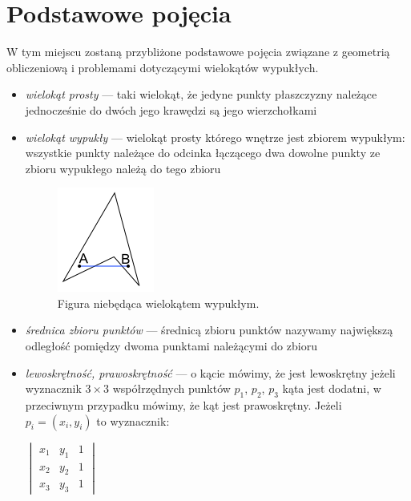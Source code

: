 \chapter{Podstawowe pojęcia}
W tym miejscu zostaną przybliżone podstawowe pojęcia związane z
geometrią obliczeniową i problemami dotyczącymi wielokątów wypukłych.

\begin{itemize}
\item{\emph{wielokąt prosty}} --- taki wielokąt, że jedyne punkty
  płaszczyzny należące jednocześnie do dwóch jego krawędzi są jego
  wierzchołkami
\item{\emph{wielokąt wypukły}} --- wielokąt prosty którego wnętrze
  jest zbiorem wypukłym: wszystkie punkty należące do odcinka
  łączącego dwa dowolne punkty ze zbioru wypukłego należą do tego
  zbioru

  \begin{figure}[htp]
    \centering
    \includegraphics{img/nonconvex}
    \caption{Figura niebędąca wielokątem wypukłym.}
  \end{figure}

\item{\emph{średnica zbioru punktów}} --- średnicą zbioru punktów
  nazywamy największą odległość pomiędzy dwoma punktami należącymi do
  zbioru

\item{\emph{lewoskrętność, prawoskrętność}} --- o kącie mówimy, że
  jest lewoskrętny jeżeli wyznacznik $3 \times 3$ współrzędnych punktów
  $p_1$, $p_2$, $p_3$ kąta jest dodatni, w przeciwnym przypadku
  mówimy, że kąt jest prawoskrętny. Jeżeli $p_i = (x_i, y_i)$ to
  wyznacznik:

  \begin{center}
    \begin{math}
      \begin{vmatrix}
        x_1 & y_1 & 1 \\
        x_2 & y_2 & 1 \\
        x_3 & y_3 & 1
      \end{vmatrix}
    \end{math}
  \end{center}


\end{itemize}
